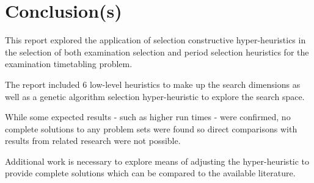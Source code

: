 \documentclass[conference]{IEEEtran}
\begin{document}
\section{Conclusion(s)}
This report explored the application of selection constructive hyper-heuristics in the selection of both examination selection and period selection heuristics for the examination timetabling problem.

The report included 6 low-level heuristics to make up the search dimensions as well as a genetic algorithm selection hyper-heuristic to explore the search space.

While some expected results - such as higher run times - were confirmed, no complete solutions to any problem sets were found so direct comparisons with results from related research were not possible.

Additional work is necessary to explore means of adjusting the hyper-heuristic to provide complete solutions which can be compared to the available literature.



\end{document}
